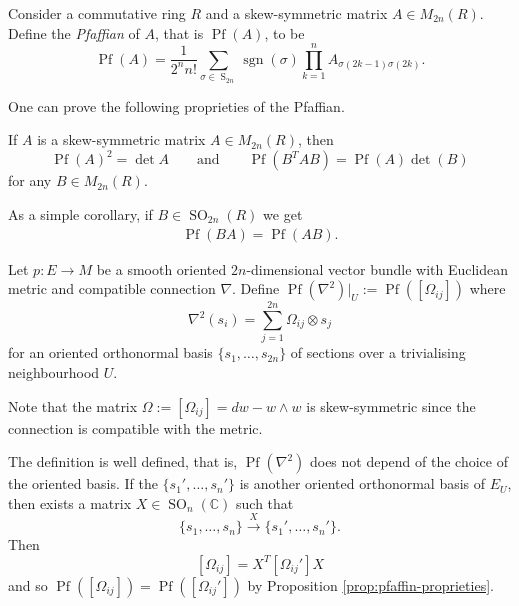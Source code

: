 \documentclass[a4paper,openany]{scrbook}
\begin{document}
\begin{defn}
    Consider a commutative ring $R$ and a skew-symmetric matrix $A \in M_{2n}(R)$. Define the \textit{Pfaffian} of $A$, that is $\operatorname{Pf}(A)$, to be
    $$\operatorname{Pf}(A) = \frac{1}{2^n n!} \sum_{\sigma \in \operatorname{S}_{2n}} \operatorname{sgn}(\sigma) \prod_{k=1}^n A_{\sigma(2k-1) \sigma(2k)}.$$
\end{defn}

One can prove the following proprieties of the Pfaffian.

\begin{prop}
\label{prop:pfaffin-proprieties}
    If $A$ is a skew-symmetric matrix $A \in M_{2n}(R)$, then
    $$\operatorname{Pf}(A)^2 = \det{A} \qquad \text{and} \qquad \operatorname{Pf}(B^TAB) = \operatorname{Pf}(A)\det(B)$$
    for any $B \in M_{2n}(R)$.
\end{prop}

As a simple corollary, if $B \in \operatorname{SO}_{2n}(R)$ we get
\begin{align}
    \label{remark:pfaffian-commutative-so}
    \operatorname{Pf}(BA)=\operatorname{Pf}(AB).
\end{align}

\begin{defn}
    Let $p:E \rightarrow M$ be a smooth oriented $2n$-dimensional vector bundle with Euclidean metric and compatible connection $\nabla$. Define $\operatorname{Pf}(\nabla^2)|_U := \operatorname{Pf}([\Omega_{ij}])$ where
    $$\nabla^2(s_i) = \sum_{j=1}^{2n} {\Omega_{ij}} \otimes s_j$$
    for an oriented orthonormal basis $\{s_1,\dots,s_{2n}\}$ of sections over a trivialising neighbourhood $U$.
\end{defn}

\begin{remark}
    Note that the matrix $\Omega:=[\Omega_{ij}] = dw-w\wedge w$ is skew-symmetric since the connection is compatible with the metric.
\end{remark}

\begin{remark}
    The definition is well defined, that is, $\operatorname{Pf}(\nabla^2)$ does not depend of the choice of the oriented basis. If the $\{s_1',\dots, s_n'\}$ is another oriented orthonormal basis of $E_U$, then exists a matrix $X \in \operatorname{SO}_n(\mathbb{C})$ such that
    $$\{s_1,\dots,s_n\} \xrightarrow{X} \{s_1',\dots, s_n'\}.$$
    Then 
    $$[\Omega_{ij}] = X^T[\Omega_{ij}']X$$
    and so $\operatorname{Pf}([\Omega_{ij}]) = \operatorname{Pf}([\Omega_{ij}'])$ by Proposition \ref{prop:pfaffin-proprieties}.
\end{remark}
\end{document}
